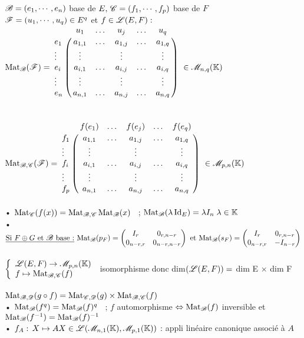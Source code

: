 \documentclass[12 pt]{book}
\begin{document}
\begin{flushleft}
\begin{doublespace}

	$\mathscr{B} = (e_1,\cdots, e_n)$ base de $E, \, \mathscr{C} = (f_1,\cdots, f_p)$ base de $F$\\
	$\mathscr{F} = (u_1,\cdots , u_q) \in E^q$ et $f\in\mathscr{L}(E,F) :$\\
	$ \Mat_\sB (\sF) = \bordermatrix { & u_1 & \dots & u_j & \dots & u_q \cr e_1 & a_{1,1} & \dots & a_{1,j} & \dots & a_{1,q} \cr \vdots & \vdots &  &\vdots &  & \vdots \cr e_i & a_{i,1} & \dots & a_{i,j} & \dots & a_{i,q} \cr \vdots & \vdots &  &\vdots &  & \vdots \cr e_n & a_{n,1} & \dots & a_{n,j} & \dots & a_{n,q} \cr} \ \in \sM_{n,q}(\K)$\\
	\text{ }\\
	\text{ }\\
	$ \Mat_{\sB ,\sC} (\sF) = \bordermatrix { & f(e_1) & \dots & f(e_j) & \dots & f(e_q) \cr f_1 & a_{1,1} & \dots & a_{1,j} & \dots & a_{1,q} \cr \vdots & \vdots &  &\vdots &  & \vdots \cr f_i & a_{i,1} & \dots & a_{i,j} & \dots & a_{i,q} \cr \vdots & \vdots &  &\vdots &  & \vdots \cr f_p & a_{n,1} & \dots & a_{n,j} & \dots & a_{n,q} \cr} \ \in \sM_{p,n}(\K)$\\
	
	\text{ }\\
	• $\text{Mat}_{\mathscr{C}} (f(x)) = \text{Mat}_{\mathscr{B},\mathscr{C}}\, \text{Mat}_{\mathscr{B}} (x)$ \ ; $\text{Mat}_{\mathscr{B}} (\lambda\, \text{Id}_E) = \lambda I_n \; \lambda\in \mathbb{K}$\\
	• $\underline{\text{Si }F\oplus G\text{ et }\mathscr{B}\text{ base :}} \ \text{Mat}_{\mathscr{B}} (p_F) = \begin{pmatrix} I_r & 0_{r, n-r} \\ 0_{n - r, r} & 0_{n - r, n - r}\end{pmatrix} \text{ et } \text{Mat}_{\mathscr{B}}(s_F) = \begin{pmatrix} I_r & 0_{r, n-r} \\ 0_{n - r, r} & - I_{n - r}\end{pmatrix}$\\
	
	\text{ }\\
	 $\left\{\begin{array}{ll} \mathscr{L}(E,F) \rightarrow \mathscr{M}_{p,n}(\mathbb{K}) \\ f \mapsto \text{Mat}_{\mathscr{B},\mathscr{C}}(f) \end{array} \right.$ isomorphisme donc dim$(\mathscr{L}(E,F)) =$ dim E $\times$ dim F\\
	 \text{ }\\
	 $\text{Mat}_{\mathscr{B},\mathscr{D}}(g\circ f) = \text{Mat}_{\mathscr{C},\mathscr{D}}(g) \times \text{Mat}_{\mathscr{B},\mathscr{C}}(f)$\\
	• $\text{Mat}_{\mathscr{B}} (f^q) = \text{Mat}_{\mathscr{B}}(f)^q$ \ ; $f$ automorphisme $\Leftrightarrow \text{Mat}_{\mathscr{B}}(f)$ inversible et $\text{Mat}_{\mathscr{B}}(f^{- 1}) = \text{Mat}_{\mathscr{B}}(f)^{- 1}$\\
	• $f_A : \, X \mapsto AX \in\mathscr{L}(\mathscr{M}_{n,1}(\mathbb{K}),\mathscr{M}_{p, 1}(\mathbb{K}) )$ : appli linéaire canonique associé à $A$\\
	

\end{doublespace}
\end{flushleft}
\end{document}
